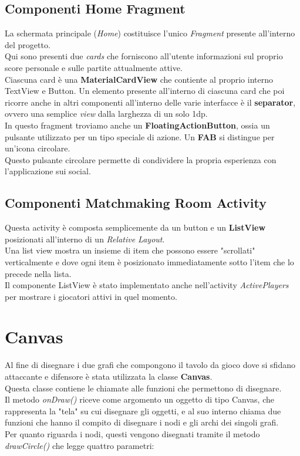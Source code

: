 \documentclass[a4paper,11pt,twoside,openright]{report}
\begin{document}
\subsection{Componenti Home Fragment}
La schermata principale (\textit{Home}) costituisce l'unico \textit{Fragment} presente all'interno del progetto.\\
Qui sono presenti due \textit{cards} che forniscono all'utente informazioni sul proprio score personale e sulle partite attualmente attive.\\
Ciascuna card è una \textbf{MaterialCardView} che contiente al proprio interno TextView e Button. Un elemento presente all'interno di ciascuna card che poi ricorre anche in altri componenti all'interno delle varie interfacce è il \textbf{separator}, ovvero una semplice \textit{view} dalla larghezza di un solo 1dp.\\
In questo fragment troviamo anche un \textbf{FloatingActionButton}\cite{12}, ossia un pulsante utilizzato per un tipo speciale di azione. Un \textbf{FAB} si distingue per un'icona circolare.\\
Questo pulsante circolare permette di condividere la propria esperienza con l'applicazione sui social.\\

\subsection{Componenti Matchmaking Room Activity}
Questa activity è composta semplicemente da un button e un \textbf{ListView} posizionati all'interno di un \textit{Relative Layout}.\\
Una list view mostra un insieme di item che possono essere "scrollati" verticalmente e dove ogni item è posizionato immediatamente sotto l'item che lo precede nella lista.\\
Il componente ListView è stato implementato anche nell'activity \textit{ActivePlayers} per mostrare i giocatori attivi in quel momento.

\section{Canvas}
Al fine di disegnare i due grafi che compongono il tavolo da gioco dove si sfidano attaccante e difensore è stata utilizzata la classe \textbf{Canvas}.\\
Questa classe contiene le chiamate alle funzioni che permettono di disegnare.\\
Il metodo \textit{onDraw()} riceve come argomento un oggetto di tipo Canvas, che rappresenta la "tela" su cui disegnare gli oggetti, e al suo interno chiama due funzioni che hanno il compito di disegnare i nodi e gli archi dei singoli grafi.\\
Per quanto riguarda i nodi, questi vengono disegnati tramite il metodo \textit{drawCircle()} che legge quattro parametri:
\end{document}
